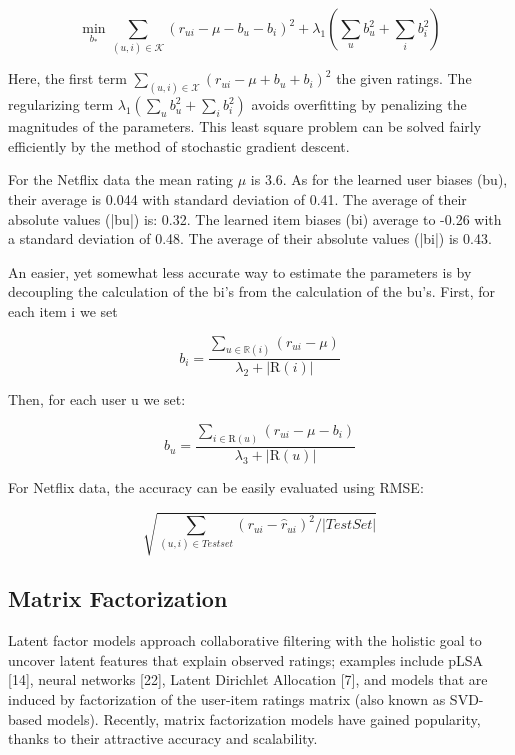 $$
\min _ { b _ { * } } \sum _ { ( u , i ) \in \mathcal { K } } \left( r _ { u i } - \mu - b _ { u } - b _ { i } \right) ^ { 2 } + \lambda _ { 1 } \left( \sum _ { u } b _ { u } ^ { 2 } + \sum _ { i } b _ { i } ^ { 2 } \right)
$$

Here, the first term $\sum _ { ( u , i ) \in \mathcal { X } } \left( r _ { u i } - \mu + b _ { u } + b _ { i } \right) ^ { 2 }$ 
the given ratings. The regularizing term $\lambda _ { 1 } \left( \sum _ { u } b _ { u } ^ { 2 } + \sum _ { i } b _ { i } ^ { 2 } \right)$ avoids overfitting by penalizing the magnitudes of the parameters. This least square problem can be solved fairly efficiently by the method of stochastic gradient descent.

For the Netflix data the mean rating $\mu$ is 3.6. As for the learned user biases (bu), their average is 0.044 with standard deviation of 0.41. The average of their absolute values (|bu|) is: 0.32. The learned item biases (bi) average to -0.26 with a standard deviation of 0.48. The average of their absolute values (|bi|) is 0.43.

An easier, yet somewhat less accurate way to estimate the parameters is by decoupling the calculation of the bi’s from the calculation of the bu’s. First, for each item i we set

$$
b _ { i } = \frac { \sum _ { u \in \mathbb { R } ( i ) } \left( r _ { u i } - \mu \right) } { \lambda _ { 2 } + | \mathrm { R } ( i ) | }
$$

Then, for each user u we set:

$$b _ { u } = \frac { \sum _ { i \in \mathrm { R } ( u ) } \left( r _ { u i } - \mu - b _ { i } \right) } { \lambda _ { 3 } + | \mathrm { R } ( u ) | }$$

For Netflix data, the accuracy can be easily evaluated using RMSE:

$$
\sqrt { \sum _ { ( u , i ) \in T e s t s e t } \left( r _ { u i } - \hat { r } _ { u i } \right) ^ { 2 } / | T e s t S e t | }
$$

\subsection{Matrix Factorization}

Latent factor models approach collaborative filtering with the holistic goal to uncover latent features that explain observed ratings; examples include pLSA [14], neural networks [22], Latent Dirichlet Allocation [7], and models that are induced by factorization of the user-item ratings matrix (also known as SVD-based models). Recently, matrix factorization models have gained popularity, thanks to their attractive accuracy and scalability.

